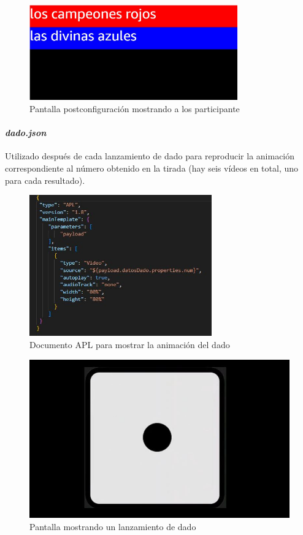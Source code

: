 \begin{figure}[H]
	\centering
	\includegraphics[width=0.8\textwidth]{imgs/interfaz-2.jpg}
	\caption{Pantalla postconfiguración mostrando a los participante}
	\label{fig:interfaz-2}
\end{figure}

\paragraph{\textit{dado.json}}

Utilizado después de cada lanzamiento de dado para reproducir la animación correspondiente al número obtenido en la tirada (hay seis vídeos en total, uno para cada resultado).

\begin{figure}[H]
	\centering
	\includegraphics[width=0.7\textwidth]{imgs/apl-dado.jpg}
	\caption{Documento APL para mostrar la animación del dado}
	\label{fig:apl-dado}
\end{figure}

\begin{figure}[H]
	\centering
	\includegraphics{imgs/interfaz-3.jpg}
	\caption{Pantalla mostrando un lanzamiento de dado}
	\label{fig:interfaz-3}
\end{figure}

